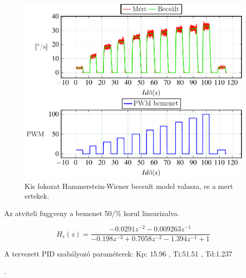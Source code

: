 \begin{figure}[H]
  \includegraphics{tikz/KFsysIdent.pdf}
  \caption{Kis fokozat Hammerstein-Wiener becsult model valasza, es a mert ertekek.}
  \label{fig:KFsysIdent}
\end{figure}

Az atviteli fuggveny a bemenet 50/\% korul linearizalva.

\begin{equation}
    H_s(z)=\frac{-0.0291z^{-2} -0.009263z^{-1}}{-0.198z^{-3}+0.7058z^{-2} -1.394z^{-1} +1}
\end{equation}

A tervezett PID szabályozó paraméterek: Kp: 15.96 , Ti:51.51 , Td:1.237 

.